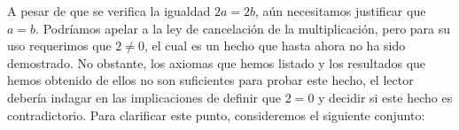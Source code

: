 \documentclass[11pt]{article}
\newcommand{\R}{\mathbb{R}}
\begin{document}
A pesar de que se verifica la igualdad $2a=2b$, aún necesitamos justificar que $a=b$. Podríamos apelar a la ley de cancelación de la multiplicación, pero para su uso requerimos que $2\neq 0$, el cual es un hecho que hasta ahora no ha sido demostrado. No obstante, los axiomas que hemos listado y los resultados que hemos obtenido de ellos no son suficientes para probar este hecho, el lector debería indagar en las implicaciones de definir que $2=0$ y decidir si este hecho es contradictorio. Para clarificar este punto, consideremos el siguiente conjunto: %
%
\end{document}
